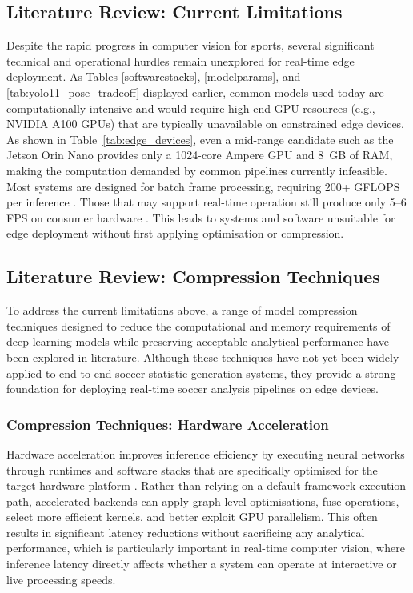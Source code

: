 \subsection{Literature Review: Current Limitations}
Despite the rapid progress in computer vision for sports, several significant technical and operational hurdles remain unexplored for real-time edge deployment. As Tables \ref{softwarestacks}, \ref{modelparams}, and \ref{tab:yolo11_pose_tradeoff} displayed earlier, common models used today \cite{hmzbo_football_analytics_dl_cv_repo, yang2025soccermaster, mradovic38_football_analysis_repo, roboflow_sports_repo} are computationally intensive and would require high-end GPU resources (e.g., NVIDIA A100 GPUs) that are typically unavailable on constrained edge devices. As shown in Table~\ref{tab:edge_devices}, even a mid-range candidate such as the Jetson Orin Nano provides only a 1024-core Ampere GPU and 8~GB of RAM, making the computation demanded by common pipelines currently infeasible. Most systems are designed for batch frame processing, requiring 200+ GFLOPS per inference \cite{yang2025soccermaster, roboflow_sports_repo}. Those that may support real-time operation still produce only 5--6 FPS on consumer hardware \cite{hmzbo_football_analytics_dl_cv_repo, mradovic38_football_analysis_repo}. This leads to systems and software unsuitable for edge deployment without first applying optimisation or compression. 



\subsection{Literature Review: Compression Techniques}

To address the current limitations above, a range of model compression techniques designed to reduce the computational and memory requirements of deep learning models while preserving acceptable analytical performance have been explored in literature. Although these techniques have not yet been widely applied to end-to-end soccer statistic generation systems, they provide a strong foundation for deploying real-time soccer analysis pipelines on edge devices.


\subsubsection{Compression Techniques: Hardware Acceleration}

Hardware acceleration improves inference efficiency by executing neural networks through runtimes and software stacks that are specifically optimised for the target hardware platform \cite{tensorrt}. Rather than relying on a default framework execution path, accelerated backends can apply graph-level optimisations, fuse operations, select more efficient kernels, and better exploit GPU parallelism. This often results in significant latency reductions without sacrificing any analytical performance, which is particularly important in real-time computer vision, where inference latency directly affects whether a system can operate at interactive or live processing speeds.

